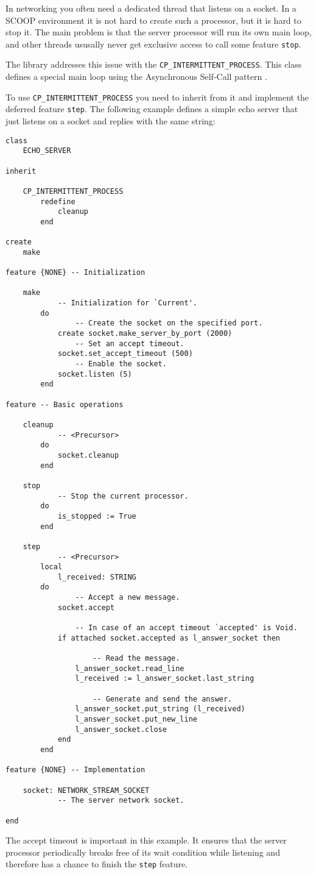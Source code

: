 In networking you often need a dedicated thread that listens on a socket.
In a SCOOP environment it is not hard to create such a processor, but it is hard to stop it.
The main problem is that the server processor will run its own main loop, and other threads ususally never get exclusive access to call some feature \lstinline!stop!.

The library addresses this issue with the \lstinline!CP_INTERMITTENT_PROCESS!.
This class defines a special main loop using the Asynchronous Self-Call pattern .

To use \lstinline!CP_INTERMITTENT_PROCESS! you need to inherit from it and implement the deferred feature \lstinline!step!.
The following example defines a simple echo server that just listens on a socket and replies with the same string:

\begin{lstlisting}[language=OOSC2Eiffel, captionpos=b, caption={The echo server class.}]
class
	ECHO_SERVER

inherit

	CP_INTERMITTENT_PROCESS
		redefine
			cleanup
		end

create
	make

feature {NONE} -- Initialization

	make
			-- Initialization for `Current'.
		do
				-- Create the socket on the specified port.
			create socket.make_server_by_port (2000)
				-- Set an accept timeout.
			socket.set_accept_timeout (500)
				-- Enable the socket.
			socket.listen (5)
		end

feature -- Basic operations

	cleanup
			-- <Precursor>
		do
			socket.cleanup
		end

	stop
			-- Stop the current processor.
		do
			is_stopped := True
		end

	step
			-- <Precursor>
		local
			l_received: STRING
		do
				-- Accept a new message.
			socket.accept
			
				-- In case of an accept timeout `accepted' is Void.
			if attached socket.accepted as l_answer_socket then

					-- Read the message.
				l_answer_socket.read_line
				l_received := l_answer_socket.last_string

					-- Generate and send the answer.
				l_answer_socket.put_string (l_received)
				l_answer_socket.put_new_line
				l_answer_socket.close
			end
		end

feature {NONE} -- Implementation

	socket: NETWORK_STREAM_SOCKET
			-- The server network socket.

end
\end{lstlisting}
The accept timeout is important in this example.
It ensures that the server processor periodically breaks free of its wait condition while listening and therefore has a chance to finish the \lstinline!step! feature.


